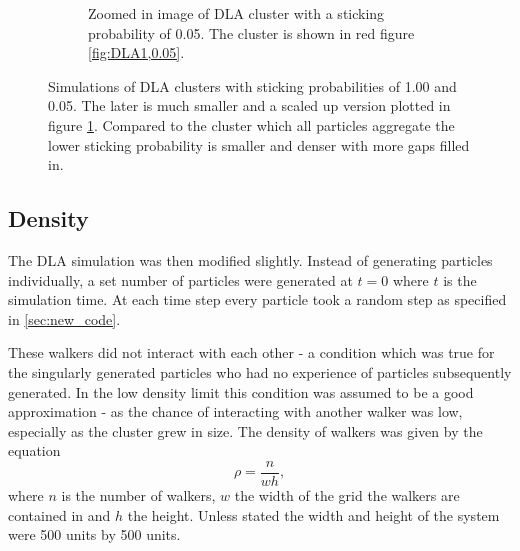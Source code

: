 \documentclass[%
 aapm,
 mph,%
 amsmath,amssymb,
 reprint,%
]{revtex4-2}
\begin{document}
\begin{figure}[ht]
\begin{subfigure}{0.45\linewidth}
\caption{\label{fig:DLA0.05}Zoomed in image of DLA cluster with a sticking probability of 0.05. The cluster is shown in red figure \ref{fig:DLA1,0.05}.}
\end{subfigure}
\caption{\label{fig:DLAClusters}Simulations of DLA clusters with sticking probabilities of 1.00 and 0.05. The later is much smaller and a scaled up version plotted in figure \ref{fig:DLA0.05}. Compared to the cluster which all particles aggregate the lower sticking probability is smaller and denser with more gaps filled in.}
\end{figure}
\subsection{\label{sec:density_simulation}Density}
The DLA simulation was then modified slightly. Instead of generating particles individually, a set number of particles were generated at $t=0$ where $t$ is the simulation time. At each time step every particle took a random step as specified in \ref{sec:new_code}.

These walkers did not interact with each other - a condition which was true for the singularly generated particles who had no experience of particles subsequently generated. In the low density limit this condition was assumed to be a good approximation - as the chance of interacting with another walker was low, especially as the cluster grew in size. The density of walkers was given by the equation
\begin{equation}
\label{eq:density}
\rho=\frac{n}{wh},
\end{equation}
where $n$ is the number of walkers, $w$ the width of the grid the walkers are contained in and $h$ the height. Unless stated the width and height of the system were 500 units by 500 units.
\end{document}
